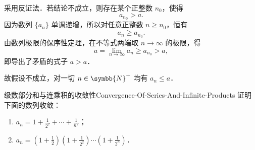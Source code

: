 \begin{myproof}
    采用反证法．若结论不成立，则存在某个正整数 $n_0$，使得
    \begin{equation}
        a_{n_0} > a.
    \end{equation}
    因为数列 $\{a_n\}$ 单调递增，所以对任意正整数 $n \geqslant n_0$，恒有
    \begin{equation}
        a_n \geqslant a_{n_0}.
    \end{equation}
    由数列极限的保序性定理，在不等式两端取 $n \to \infty$ 的极限，得
    \begin{equation}
        a = \lim_{n\to\infty} a_n \geqslant a_{n_0} > a,
    \end{equation}
    即导出了矛盾的式子 $a > a$．

    故假设不成立，对一切 $n \in \symbb{N}^+$ 均有 $a_n \leqslant a$．
\end{myproof}

\begin{problem}{级数部分和与连乘积的收敛性}{Convergence-Of-Series-And-Infinite-Products}
    证明下面的数列收敛：
    \begin{enumerate}
        \item $a_n = 1 + \frac{1}{2^2} + \cdots + \frac{1}{n^2}$；
        \item $a_n = \left( 1 + \frac{1}{2} \right) \left( 1 + \frac{1}{2^2} \right) \cdots \left( 1 + \frac{1}{2^n} \right)$．
    \end{enumerate}
\end{problem}

